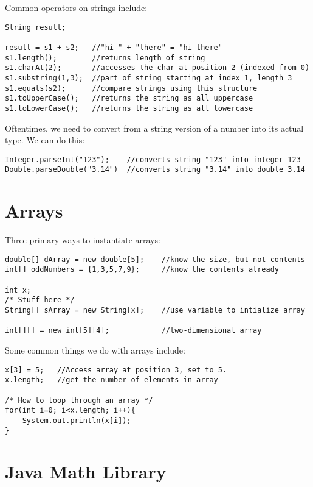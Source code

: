 \documentclass[paper=a4, fontsize=11pt, parskip=full]{scrartcl} %
\numberwithin{equation}{section} %
\numberwithin{figure}{section} %
\numberwithin{table}{section} %
\begin{document}
Common operators on strings include:

\begin{lstlisting}
String result;

result = s1 + s2; 	//"hi " + "there" = "hi there"
s1.length();		//returns length of string
s1.charAt(2);		//accesses the char at position 2 (indexed from 0)
s1.substring(1,3);	//part of string starting at index 1, length 3
s1.equals(s2);		//compare strings using this structure
s1.toUpperCase();	//returns the string as all uppercase
s1.toLowerCase();	//returns the string as all lowercase
\end{lstlisting}

Oftentimes, we need to convert from a string version of a number into its actual type. We can do this:

\begin{lstlisting}
Integer.parseInt("123");	//converts string "123" into integer 123
Double.parseDouble("3.14")	//converts string "3.14" into double 3.14
\end{lstlisting}


\section{Arrays}

Three primary ways to instantiate arrays:

\begin{lstlisting}
double[] dArray = new double[5];	//know the size, but not contents
int[] oddNumbers = {1,3,5,7,9};		//know the contents already

int x;
/* Stuff here */
String[] sArray = new String[x];	//use variable to intialize array

int[][] = new int[5][4];			//two-dimensional array
\end{lstlisting}

Some common things we do with arrays include:

\begin{lstlisting}
x[3] = 5;	//Access array at position 3, set to 5.
x.length;	//get the number of elements in array

/* How to loop through an array */
for(int i=0; i<x.length; i++){
	System.out.println(x[i]);
}
\end{lstlisting}

\section{Java Math Library}
\end{document}
